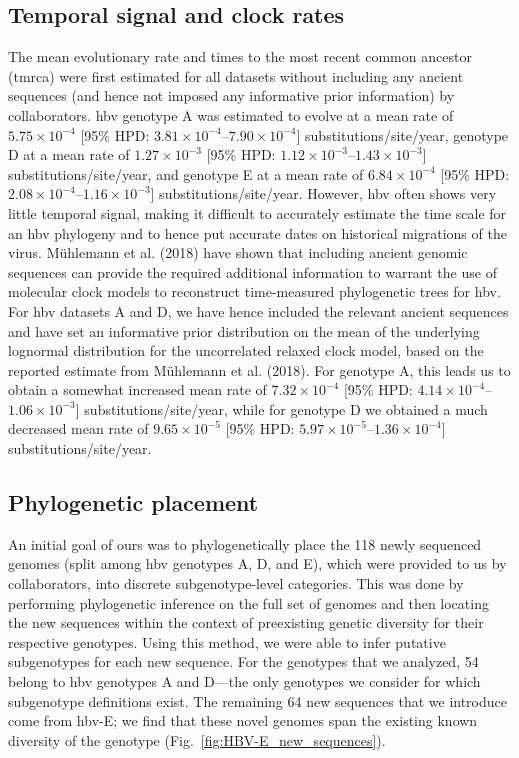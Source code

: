 \subsection{Temporal signal and clock rates}

The mean evolutionary rate and times to the most recent common ancestor (\gls{tmrca}) were first estimated for all datasets without including any ancient sequences (and hence not imposed any informative prior information) by collaborators.
\gls{hbv} genotype A was estimated to evolve at a mean rate of $5.75\times10^{-4}$ [95\% HPD: $3.81\times10^{-4}$--$7.90\times10^{-4}$] substitutions/site/year, genotype D at a mean rate of $1.27\times10^{-3}$ [95\% HPD: $1.12\times10^{-3}$--$1.43\times10^{-3}$] substitutions/site/year, and genotype E at a mean rate of $6.84\times10^{-4}$ [95\% HPD: $2.08\times10^{-4}$--$1.16\times10^{-3}$] substitutions/site/year.
However, \gls{hbv} often shows very little temporal signal, making it difficult to accurately estimate the time scale for an \gls{hbv} phylogeny and to hence put accurate dates on historical migrations of the virus.
M{\"u}hlemann et al. (2018) have shown that including ancient genomic sequences can provide the required additional information to warrant the use of molecular clock models to reconstruct time-measured phylogenetic trees for \gls{hbv}.
For \gls{hbv} datasets A and D, we have hence included the relevant ancient sequences and have set an informative prior distribution on the mean of the underlying lognormal distribution for the uncorrelated relaxed clock model, based on the reported estimate from M{\"u}hlemann et al. (2018).
For genotype A, this leads us to obtain a somewhat increased mean rate of $7.32\times10^{-4}$ [95\% HPD: $4.14\times10^{-4}$--$1.06\times10^{-3}$] substitutions/site/year, while for genotype D we obtained a much decreased mean rate of $9.65\times10^{-5}$ [95\% HPD: $5.97\times10^{-5}$--$1.36\times10^{-4}$] substitutions/site/year. %

\subsection{Phylogenetic placement}

An initial goal of ours was to phylogenetically place the 118 newly sequenced genomes (split among \gls{hbv} genotypes A, D, and E), which were provided to us by collaborators, into discrete subgenotype-level categories.
This was done by performing phylogenetic inference on the full set of genomes and then locating the new sequences within the context of preexisting genetic diversity for their respective genotypes.
Using this method, we were able to infer putative subgenotypes for each new sequence.
For the genotypes that we analyzed, 54 belong to \gls{hbv} genotypes A and D---the only genotypes we consider for which subgenotype definitions exist.
The remaining 64 new sequences that we introduce come from \gls{hbv}-E; we find that these novel genomes span the existing known diversity of the genotype (Fig.~\ref{fig:HBV-E_new_sequences}).

